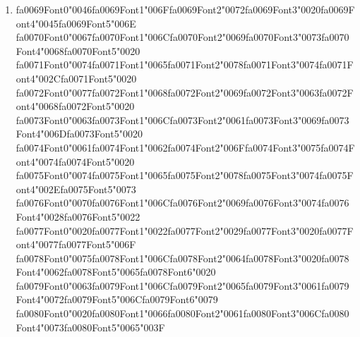 \documentclass[11pt]{article}
\begin{document}
\begin{enumerate}[leftmargin=*]
  \item {\csname fa0069Font0\endcsname\char"0046}{\csname fa0069Font1\endcsname\char"006F}{\csname fa0069Font2\endcsname\char"0072}{\csname fa0069Font3\endcsname\char"0020}{\csname fa0069Font4\endcsname\char"0045}{\csname fa0069Font5\endcsname\char"006E} {\csname fa0070Font0\endcsname\char"0067}{\csname fa0070Font1\endcsname\char"006C}{\csname fa0070Font2\endcsname\char"0069}{\csname fa0070Font3\endcsname\char"0073}{\csname fa0070Font4\endcsname\char"0068}{\csname fa0070Font5\endcsname\char"0020} {\csname fa0071Font0\endcsname\char"0074}{\csname fa0071Font1\endcsname\char"0065}{\csname fa0071Font2\endcsname\char"0078}{\csname fa0071Font3\endcsname\char"0074}{\csname fa0071Font4\endcsname\char"002C}{\csname fa0071Font5\endcsname\char"0020} {\csname fa0072Font0\endcsname\char"0077}{\csname fa0072Font1\endcsname\char"0068}{\csname fa0072Font2\endcsname\char"0069}{\csname fa0072Font3\endcsname\char"0063}{\csname fa0072Font4\endcsname\char"0068}{\csname fa0072Font5\endcsname\char"0020} {\csname fa0073Font0\endcsname\char"0063}{\csname fa0073Font1\endcsname\char"006C}{\csname fa0073Font2\endcsname\char"0061}{\csname fa0073Font3\endcsname\char"0069}{\csname fa0073Font4\endcsname\char"006D}{\csname fa0073Font5\endcsname\char"0020} {\csname fa0074Font0\endcsname\char"0061}{\csname fa0074Font1\endcsname\char"0062}{\csname fa0074Font2\endcsname\char"006F}{\csname fa0074Font3\endcsname\char"0075}{\csname fa0074Font4\endcsname\char"0074}{\csname fa0074Font5\endcsname\char"0020} {\csname fa0075Font0\endcsname\char"0074}{\csname fa0075Font1\endcsname\char"0065}{\csname fa0075Font2\endcsname\char"0078}{\csname fa0075Font3\endcsname\char"0074}{\csname fa0075Font4\endcsname\char"002E}{\csname fa0075Font5\endcsname\char"0073} {\csname fa0076Font0\endcsname\char"0070}{\csname fa0076Font1\endcsname\char"006C}{\csname fa0076Font2\endcsname\char"0069}{\csname fa0076Font3\endcsname\char"0074}{\csname fa0076Font4\endcsname\char"0028}{\csname fa0076Font5\endcsname\char"0022} {\csname fa0077Font0\endcsname\char"0020}{\csname fa0077Font1\endcsname\char"0022}{\csname fa0077Font2\endcsname\char"0029}{\csname fa0077Font3\endcsname\char"0020}{\csname fa0077Font4\endcsname\char"0077}{\csname fa0077Font5\endcsname\char"006F} {\csname fa0078Font0\endcsname\char"0075}{\csname fa0078Font1\endcsname\char"006C}{\csname fa0078Font2\endcsname\char"0064}{\csname fa0078Font3\endcsname\char"0020}{\csname fa0078Font4\endcsname\char"0062}{\csname fa0078Font5\endcsname\char"0065}{\csname fa0078Font6\endcsname\char"0020} {\csname fa0079Font0\endcsname\char"0063}{\csname fa0079Font1\endcsname\char"006C}{\csname fa0079Font2\endcsname\char"0065}{\csname fa0079Font3\endcsname\char"0061}{\csname fa0079Font4\endcsname\char"0072}{\csname fa0079Font5\endcsname\char"006C}{\csname fa0079Font6\endcsname\char"0079} {\csname fa0080Font0\endcsname\char"0020}{\csname fa0080Font1\endcsname\char"0066}{\csname fa0080Font2\endcsname\char"0061}{\csname fa0080Font3\endcsname\char"006C}{\csname fa0080Font4\endcsname\char"0073}{\csname fa0080Font5\endcsname\char"0065}{\char"003F}

\end{enumerate}
\end{document}
